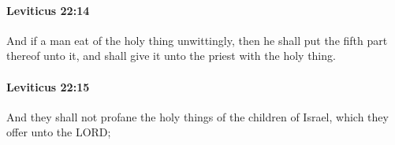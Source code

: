 		\paragraph{Leviticus 22:14} %
			\label{LEVITICUS-22-14}

			And if a man eat of the holy thing unwittingly, then he shall put the fifth part thereof unto it, and shall give it unto the priest with the holy thing.


		\paragraph{Leviticus 22:15} %
			\label{LEVITICUS-22-15}

			And they shall not profane the holy things of the children of Israel, which they offer unto the LORD;


